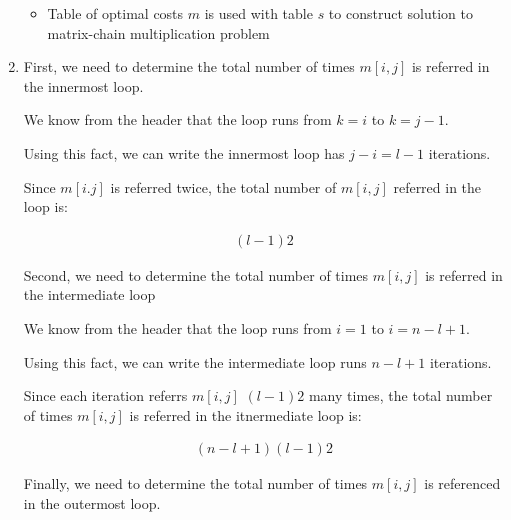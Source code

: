 \documentclass[12pt]{article}
\begin{document}
\begin{enumerate}[1.]
\begin{itemize}
        \bigskip

        \item Table of optimal costs $m$ is used with table $s$ to construct solution to
        matrix-chain multiplication problem

    \end{itemize}

    \item
    \setcounter{equation}{0}
    \bigskip

    First, we need to determine the total number of times $m[i,j]$ is referred in the
    innermost loop.

    \bigskip

    We know from the header that the loop runs from $k = i$ to $k = j - 1$.

    \bigskip

    Using this fact, we can write the innermost loop has $j - i = l - 1$ iterations.

    \bigskip

    Since $m[i.j]$ is referred twice, the total number of $m[i,j]$ referred
    in the loop is:

    \begin{align}
        (l - 1)2
    \end{align}

    \bigskip

    Second, we need to determine the total number of times $m[i,j]$ is referred in the
    intermediate loop

    \bigskip

    We know from the header that the loop runs from $i = 1$ to $i = n - l + 1$.

    \bigskip

    Using this fact, we can write the intermediate loop runs $n - l + 1$ iterations.

    \bigskip

    Since each iteration referrs $m[i,j]$ $(l - 1)2$ many times, the total number
    of times $m[i,j]$ is referred in the itnermediate loop is:

    \bigskip

    \begin{align}
        (n - l + 1)(l - 1)2
    \end{align}

    \bigskip

    Finally, we need to determine the total number of times $m[i,j]$ is referenced
    in the outermost loop.


\end{enumerate}
\end{document}
